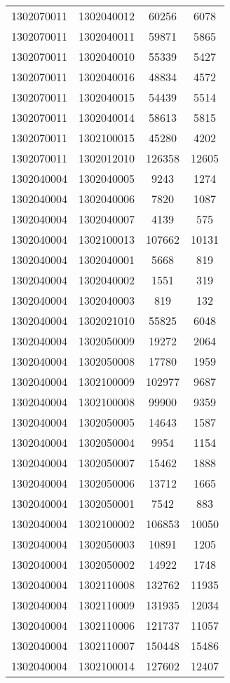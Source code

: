 \begin{longtable}{llcc}
1302070011 & 1302040012 & 60256 & 6078\\
1302070011 & 1302040011 & 59871 & 5865\\
1302070011 & 1302040010 & 55339 & 5427\\
1302070011 & 1302040016 & 48834 & 4572\\
1302070011 & 1302040015 & 54439 & 5514\\
1302070011 & 1302040014 & 58613 & 5815\\
1302070011 & 1302100015 & 45280 & 4202\\
1302070011 & 1302012010 & 126358 & 12605\\
1302040004 & 1302040005 & 9243 & 1274\\
1302040004 & 1302040006 & 7820 & 1087\\
1302040004 & 1302040007 & 4139 & 575\\
1302040004 & 1302100013 & 107662 & 10131\\
1302040004 & 1302040001 & 5668 & 819\\
1302040004 & 1302040002 & 1551 & 319\\
1302040004 & 1302040003 & 819 & 132\\
1302040004 & 1302021010 & 55825 & 6048\\
1302040004 & 1302050009 & 19272 & 2064\\
1302040004 & 1302050008 & 17780 & 1959\\
1302040004 & 1302100009 & 102977 & 9687\\
1302040004 & 1302100008 & 99900 & 9359\\
1302040004 & 1302050005 & 14643 & 1587\\
1302040004 & 1302050004 & 9954 & 1154\\
1302040004 & 1302050007 & 15462 & 1888\\
1302040004 & 1302050006 & 13712 & 1665\\
1302040004 & 1302050001 & 7542 & 883\\
1302040004 & 1302100002 & 106853 & 10050\\
1302040004 & 1302050003 & 10891 & 1205\\
1302040004 & 1302050002 & 14922 & 1748\\
1302040004 & 1302110008 & 132762 & 11935\\
1302040004 & 1302110009 & 131935 & 12034\\
1302040004 & 1302110006 & 121737 & 11057\\
1302040004 & 1302110007 & 150448 & 15486\\
1302040004 & 1302100014 & 127602 & 12407\\

\end{longtable}
